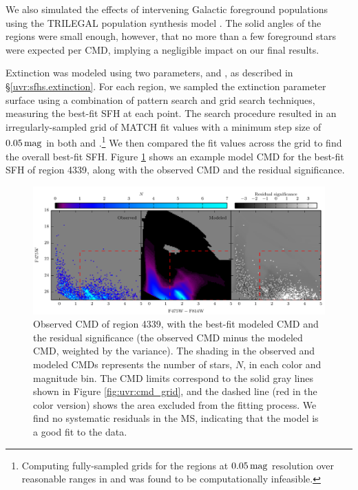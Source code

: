 We also simulated the effects of intervening Galactic foreground populations
using the TRILEGAL population synthesis model \citep{Girardi:2005}. The solid
angles of the regions were small enough, however, that no more than a few
foreground stars were expected per CMD, implying a negligible impact on our
final results.

Extinction was modeled using two parameters, \avf{} and
\dav{}, as described in \S \ref{uvr:sfhs.extinction}. For each region, we
sampled the extinction parameter surface using a combination of pattern search
and grid search techniques, measuring the best-fit SFH at each point. The
search procedure resulted in an irregularly-sampled grid of MATCH fit values
with a minimum step size of $0.05\,\mathrm{mag}$ in both \avf{} and
\dav{}.\footnote{Computing fully-sampled grids for the regions at
$0.05\,\mathrm{mag}$ resolution over reasonable ranges in \avf{} and
\dav{} was found to be computationally infeasible.} We then compared
the fit values across the grid to find the overall best-fit SFH. Figure
\ref{fig:uvr:cmdfit_4339} shows an example model CMD for the best-fit SFH of region
4339, along with the observed CMD and the residual significance.


\begin{figure}
\centering
\includegraphics[width=\textwidth]{uv_regions-figures/cmdfit_4339.pdf}
\caption[Observed CMD of region 4339, with the best-fit modeled CMD and the
    residual significance.]{Observed CMD of region 4339, with the best-fit modeled CMD and the
    residual significance (the observed CMD minus the modeled CMD, weighted by
    the variance). The shading in the observed and modeled CMDs represents the
    number of stars, $N$, in each color and magnitude bin. The CMD limits
    correspond to the solid gray lines shown in Figure \ref{fig:uvr:cmd_grid}, and
    the dashed line (red in the color version) shows the area excluded from
    the fitting process. We find no systematic residuals in the MS, indicating
    that the model is a good fit to the data.
}
\label{fig:uvr:cmdfit_4339}
\end{figure}



